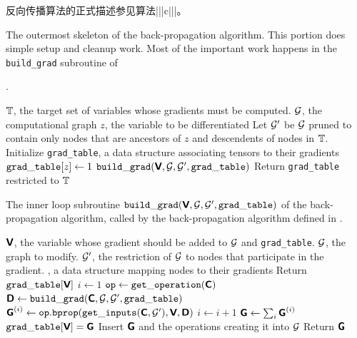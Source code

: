 反向传播算法的正式描述参见算法|||c|||。


\begin{algorithm}[ht]
\caption{The outermost skeleton of the back-propagation algorithm.
This portion does simple setup and cleanup work.
Most of the important work happens in the {\tt build\_grad} subroutine
of }. 
\label{alg:backprop}
\begin{algorithmic}
\REQUIRE $\mathbb{T}$, the target set of variables whose gradients must be computed.
\REQUIRE $\mathcal{G}$, the computational graph
\REQUIRE $z$, the variable to be differentiated
\STATE Let $\mathcal{G}'$ be $\mathcal{G}$ pruned to contain only nodes that are ancestors
of $z$ and descendents of nodes in $\mathbb{T}$.
\STATE Initialize {\tt grad\_table}, a data structure associating tensors
to their gradients
\STATE ${\tt grad\_table}[z] \leftarrow 1$
\STATE ${\tt build\_grad}(\textsf{\textbf{V}}, \mathcal{G}, \mathcal{G}', {\tt grad\_table})$
\ENDFOR
\STATE Return {\tt grad\_table} restricted to $\mathbb{T}$
\end{algorithmic}
\end{algorithm}

\begin{algorithm}[ht]
\caption{The inner loop subroutine
${\tt build\_grad}(\textsf{\textbf{V}}, \mathcal{G}, \mathcal{G}', {\tt grad\_table})$
of the back-propagation algorithm, called by
the back-propagation algorithm defined in .
}
\label{alg:build_grad}
\begin{algorithmic}
\REQUIRE $\textsf{\textbf{V}}$, the variable whose gradient should be added to $\mathcal{G}$
and {\tt grad\_table}.
\REQUIRE $\mathcal{G}$, the graph to modify.
\REQUIRE $\mathcal{G}'$, the restriction of $\mathcal{G}$ to nodes that participate
in the gradient.
, a data structure mapping nodes to their
gradients
 \STATE Return ${\tt grad\_table}[\textsf{\textbf{V}}]$
\ENDIF
\STATE $i \leftarrow 1$
\STATE ${\tt op} \leftarrow {\tt get\_operation}(\textsf{\textbf{C}})$
\STATE $\textsf{\textbf{D}} \leftarrow {\tt build\_grad}(\textsf{\textbf{C}}, \mathcal{G}, \mathcal{G}', {\tt grad\_table})$
\STATE $\textsf{\textbf{G}}^{(i)} \leftarrow {\tt op.bprop}({\tt get\_inputs}(\textsf{\textbf{C}}, \mathcal{G}'), \textsf{\textbf{V}}, \textsf{\textbf{D}})$ 
\STATE $i \leftarrow i + 1$
\ENDFOR
\STATE $\textsf{\textbf{G}} \leftarrow \sum_i \textsf{\textbf{G}}^{(i)}$
\STATE ${\tt grad\_table}[\textsf{\textbf{V}}] = \textsf{\textbf{G}}$
\STATE Insert $\textsf{\textbf{G}}$ and the operations creating it into $\mathcal{G}$
\STATE Return $\textsf{\textbf{G}}$
\end{algorithmic}
\end{algorithm}



